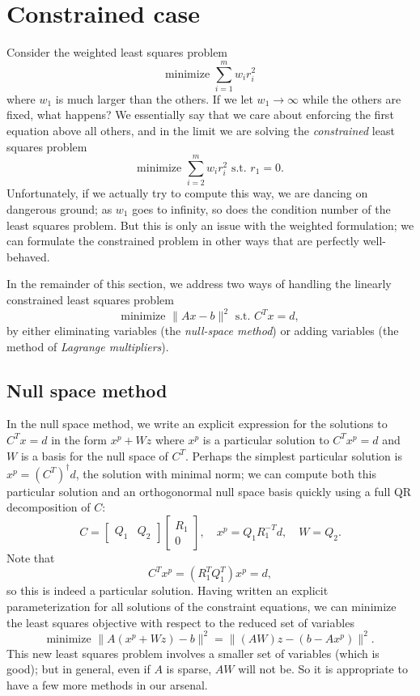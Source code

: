\section{Constrained case}

Consider the weighted least squares problem
\[
  \mbox{minimize } \sum_{i=1}^m w_i r_i^2
\]
where $w_1$ is much larger than the others.  If we
let $w_1 \rightarrow \infty$ while the others are fixed, what happens?
We essentially say that we care about enforcing the first equation
above all others, and in the limit we are solving the {\em constrained}
least squares problem
\[
  \mbox{minimize } \sum_{i=2}^m w_i r_i^2 \mbox{ s.t. } r_1 = 0.
\]
Unfortunately, if we actually try to compute this way, we are dancing on
dangerous ground; as $w_1$ goes to infinity, so does the condition
number of the least squares problem.  But this is only an issue with the
weighted formulation; we can formulate the constrained problem in other
ways that are perfectly well-behaved.

In the remainder of this section, we address two ways of handling
the linearly constrained least squares problem
\[
  \mbox{minimize } \|Ax-b\|^2 \mbox{ s.t. } C^T x = d,
\]
by either eliminating variables (the {\em null-space method}) or adding
variables (the method of {\em Lagrange multipliers}).

\subsection{Null space method}

In the null space method, we write an explicit expression for the solutions
to $C^T x = d$ in the form $x^p + W z$ where $x^p$ is a particular solution
to $C^T x^p = d$ and $W$ is a basis for the null space of $C^T$.  Perhaps the
simplest particular solution is $x^p = (C^T)^\dagger d$, the solution with
minimal norm; we can compute both
this particular solution and an orthogonormal null space basis quickly
using a full QR decomposition of $C$:
\[
  C =
    \begin{bmatrix} Q_1 & Q_2 \end{bmatrix}
    \begin{bmatrix} R_1 \\ 0 \end{bmatrix}, \quad
  x^p = Q_1 R_1^{-T} d, \quad W = Q_2.
\]
Note that
\[
  C^T x^p = (R_1^T Q_1^T) x^p = d,
\]
so this is indeed a particular solution.
Having written an explicit parameterization for all solutions of the
constraint equations, we can minimize the least squares objective with
respect to the reduced set of variables
\[
  \mbox{minimize } \|A(x^p + Wz) - b\|^2 = \|(AW)z - (b-Ax^p)\|^2.
\]
This new least squares problem involves a smaller set of variables
(which is good); but in general, even if $A$ is sparse, $AW$ will not be.
So it is appropriate to have a few more methods in our arsenal.

